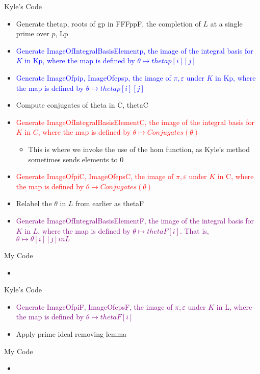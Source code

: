 \documentclass[11pt]{article}
\theoremstyle{definition}
\newcommand{\eps}{\varepsilon}
\begin{document}
\begin{multicols}{2}
Kyle's Code
\begin{itemize}
\item Generate thetap, roots of gp in FFFppF, the completion of $L$ at a single prime over $p$, Lp
\item \textcolor{blue}{Generate ImageOfIntegralBasisElementp, the image of the integral basis for $K$ in Kp, where the map is defined by $\theta \mapsto thetap[i][j]$}
\item \textcolor{blue}{Generate ImageOfpip, ImageOfepsp, the image of $\pi, \eps$ under $K$ in Kp, where the map is defined by $\theta \mapsto thetap[i][j]$}
\item Compute conjugates of theta in C, thetaC
\item \textcolor{red}{Generate ImageOfIntegralBasisElementC, the image of the integral basis for $K$ in $C$, where the map is defined by $\theta \mapsto Conjugates(\theta)$}
\begin{itemize}
\item This is where we invoke the use of the hom function, as Kyle's method sometimes sends elements to $0$
\end{itemize}
\item \textcolor{red}{Generate ImageOfpiC, ImageOfepsC, the image of $\pi, \eps$ under $K$ in C, where the map is defined by $\theta \mapsto Conjugates(\theta)$}
\item Relabel the $\theta$ in $L$ from earlier as thetaF
\item \textcolor{purple}{Generate ImageOfIntegralBasisElementF, the image of the integral basis for $K$ in $L$, where the map is defined by $\theta \mapsto thetaF[i]$. That is, $\theta \mapsto \theta[i][j] in L$}
\end{itemize}

\columnbreak 

My Code
\begin{itemize}
\item
\end{itemize}
\end{multicols}

\begin{multicols}{2}
Kyle's Code
\begin{itemize}
\item \textcolor{purple}{Generate ImageOfpiF, ImageOfepsF, the image of $\pi, \eps$ under $K$ in L, where the map is defined by $\theta \mapsto thetaF[i]$}
\item Apply prime ideal removing lemma \\
\end{itemize}

\columnbreak 

My Code
\begin{itemize}
\item
\end{itemize}
\end{multicols}
\end{document}
